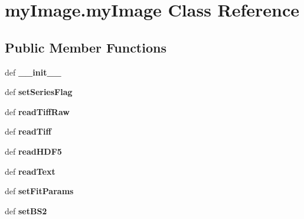 \hypertarget{classmyImage_1_1myImage}{\section{my\-Image.\-my\-Image Class Reference}
\label{classmyImage_1_1myImage}
}
\subsection*{Public Member Functions}
\begin{DoxyCompactItemize}
\item 
\hypertarget{classmyImage_1_1myImage_a204047031d17ac62cf6dc595185d4b32}{def {\bfseries \-\_\-\-\_\-init\-\_\-\-\_\-}}\label{classmyImage_1_1myImage_a204047031d17ac62cf6dc595185d4b32}

\item 
\hypertarget{classmyImage_1_1myImage_a768c74be8efacd379b8cd320a085f999}{def {\bfseries set\-Series\-Flag}}\label{classmyImage_1_1myImage_a768c74be8efacd379b8cd320a085f999}

\item 
\hypertarget{classmyImage_1_1myImage_ad204cb41e7063c2c059be7edcb869fde}{def {\bfseries read\-Tiff\-Raw}}\label{classmyImage_1_1myImage_ad204cb41e7063c2c059be7edcb869fde}

\item 
\hypertarget{classmyImage_1_1myImage_a9b2b7ca12028fc3c486ba1596986d200}{def {\bfseries read\-Tiff}}\label{classmyImage_1_1myImage_a9b2b7ca12028fc3c486ba1596986d200}

\item 
\hypertarget{classmyImage_1_1myImage_a917e8be7bd24e011ec4fdb6b5e302a76}{def {\bfseries read\-H\-D\-F5}}\label{classmyImage_1_1myImage_a917e8be7bd24e011ec4fdb6b5e302a76}

\item 
\hypertarget{classmyImage_1_1myImage_abf9d2037186dd54cfc3f98d3a14ec7b2}{def {\bfseries read\-Text}}\label{classmyImage_1_1myImage_abf9d2037186dd54cfc3f98d3a14ec7b2}

\item 
\hypertarget{classmyImage_1_1myImage_ab635848195e04c8ee65750cd608050d5}{def {\bfseries set\-Fit\-Params}}\label{classmyImage_1_1myImage_ab635848195e04c8ee65750cd608050d5}

\item 
\hypertarget{classmyImage_1_1myImage_abafcf585a9411b11a26e43db2f840d89}{def {\bfseries set\-B\-S2}}\label{classmyImage_1_1myImage_abafcf585a9411b11a26e43db2f840d89}


\end{DoxyCompactItemize}
